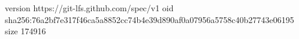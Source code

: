 version https://git-lfs.github.com/spec/v1
oid sha256:76a2bf7e317f46ca5a8852cc74b4e39d890af0a07956a5758c40b27743e06195
size 174916
